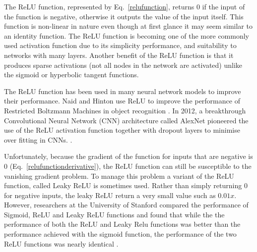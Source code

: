 The ReLU function, represented by  Eq.~\ref{relufunction}, returns $0$ if the input of the function is negative, otherwise it outputs the value of the input itself. This function is non-linear in nature even though at first glance it may seem similar to an identity function. The ReLU function is becoming one of the more commonly used activation function due to its simplicity performance, and suitability to networks with many layers. Another benefit of the ReLU function is that it produces sparse activations (not all nodes in the network are activated) unlike the sigmoid or hyperbolic tangent functions. 

The ReLU function has been used in many neural network models to improve their performance. Naid and Hinton use ReLU to improve the performance of Restricted Boltzmann Machines in object recognition \citep{Nair2010}. In 2012, a breakthrough Convolutional Neural Network (CNN) architecture called AlexNet pioneered the use of the ReLU activation function together with dropout layers to minimise over fitting in CNNs.  \citep{KrizhevskyAlex2017Icwd}. 

Unfortunately, because the gradient of the function for inputs that are negative is $0$ (Eq.~\ref{relufunctionderivative}), the ReLU function can still be susceptible to the vanishing gradient problem. To manage this problem a variant of the ReLU function, called Leaky ReLU is sometimes used. Rather than simply returning 0 for negative inputs, the leaky ReLU return a very small value such as $0.01x$. However, researchers at the University of Stanford compared the performance of Sigmoid, ReLU and Leaky ReLU functions and found that while the the performance of both the ReLU and Leaky Relu functions was better than the performance achieved with the sigmoid function, the performance of the two ReLU functions was nearly identical  \citep{maas2013rectifier}.

